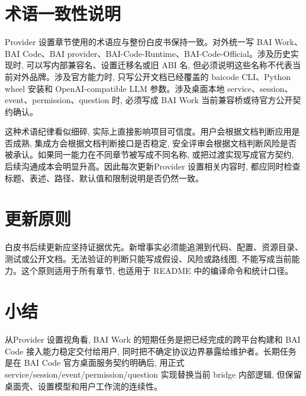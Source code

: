 \section{术语一致性说明}
Provider 设置章节使用的术语应与整份白皮书保持一致。对外统一写 BAI Work、BAI Code、BAI provider、BAI-Code-Runtime、BAI-Code-Official。涉及历史实现时, 可以写内部兼容名、设置迁移名或旧 ABI 名, 但必须说明这些名称不代表当前对外品牌。涉及官方能力时, 只写公开文档已经覆盖的 baicode CLI、Python wheel 安装和 OpenAI-compatible LLM 参数。涉及桌面本地 service、session、event、permission、question 时, 必须写成 BAI Work 当前兼容桥或待官方公开契约确认。

这种术语纪律看似细碎, 实际上直接影响项目可信度。用户会根据文档判断应用是否成熟, 集成方会根据文档判断接口是否稳定, 安全评审会根据文档判断风险是否被承认。如果同一能力在不同章节被写成不同名称, 或把过渡实现写成官方契约, 后续沟通成本会明显升高。因此每次更新Provider 设置相关内容时, 都应同时检查标题、表述、路径、默认值和限制说明是否仍然一致。

\section{更新原则}
白皮书后续更新应坚持证据优先。新增事实必须能追溯到代码、配置、资源目录、测试或公开文档。无法验证的判断只能写成假设、风险或路线图, 不能写成当前能力。这个原则适用于所有章节, 也适用于 README 中的编译命令和统计口径。

\section{小结}
从Provider 设置视角看, BAI Work 的短期任务是把已经完成的跨平台构建和 BAI Code 接入能力稳定交付给用户, 同时把不确定协议边界暴露给维护者。长期任务是在 BAI Code 官方桌面服务契约明确后, 用正式 service/session/event/permission/question 实现替换当前 bridge 内部逻辑, 但保留桌面壳、设置模型和用户工作流的连续性。
